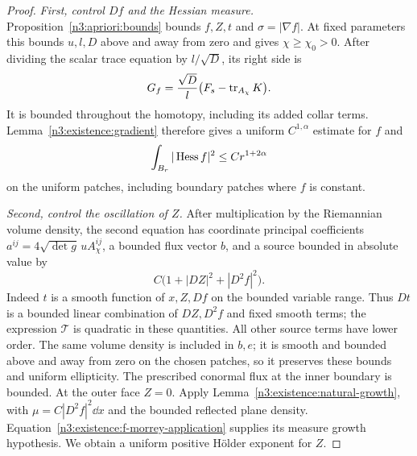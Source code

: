 \begin{proof}
\emph{First, control $Df$ and the Hessian measure.}
Proposition~\ref{n3:apriori:bounds} bounds $f,Z,t$ and
$\sigma=|\nabla f|$. At fixed parameters this bounds $u,l,D$
above and away from zero and gives $\chi\ge\chi_0>0$.  After dividing the scalar trace
equation by $l/\sqrt D$, its right side is
\begin{equation}\label{n3:existence:normalized-f-source}
 G_f=\frac{\sqrt D}{l}
         \bigl(F_s-\operatorname{tr}_{A_\chi}K\bigr).
\end{equation}
It is bounded throughout the homotopy, including its added collar
terms.  Lemma~\ref{n3:existence:gradient} therefore gives a uniform
$C^{1,\alpha}$ estimate for $f$ and
\begin{equation}\label{n3:existence:f-morrey-application}
 \int_{B_r}|\operatorname{Hess} f|^2\le Cr^{1+2\alpha}
\end{equation}
on the uniform patches, including boundary patches where $f$ is
constant.

\emph{Second, control the oscillation of $Z$.}
After multiplication by the Riemannian volume density, the second
equation has coordinate principal coefficients
$a^{ij}=4\sqrt{\det g}\,uA_\chi^{ij}$, a bounded flux vector $b$, and a source
bounded in absolute value by
\begin{equation}\label{n3:existence:Z-quadratic-source}
 C\bigl(1+|DZ|^2+|D^2f|^2\bigr).
\end{equation}
Indeed $t$ is a smooth function of $x,Z,Df$ on the bounded variable
range.  Thus $Dt$ is a bounded linear combination of $DZ,D^2f$
and fixed smooth terms; the expression $\mathcal T$ is quadratic
in these quantities.  All other source terms have lower order.
The same volume density is included in $b,e$; it is smooth and bounded
above and away from zero on the chosen patches, so it preserves these
bounds and uniform ellipticity.  The prescribed conormal flux at the inner boundary is
bounded.  At the outer face $Z=0$.
Apply Lemma~\ref{n3:existence:natural-growth}, with
$\mu=C|D^2f|^2\dd x$ and the bounded reflected plane density.
Equation~\eqref{n3:existence:f-morrey-application} supplies its measure
growth hypothesis.  We obtain a uniform positive H\"older exponent
for $Z$.


\end{proof}
